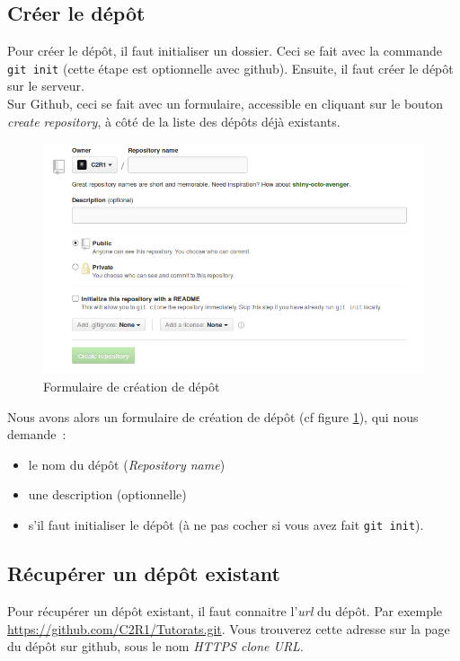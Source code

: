 \documentclass[a4paper,10pt]{report}
\begin{document}
    \subsection{Cr\'eer le d\'ep\^ot}
Pour cr\'eer le d\'ep\^ot, il faut initialiser un dossier. Ceci se fait avec la commande \verb|git init| (cette \'etape est optionnelle avec github). Ensuite, il faut cr\'eer le d\'ep\^ot sur le serveur.\\
Sur Github, ceci se fait avec un formulaire, accessible en cliquant sur le bouton \emph{create repository}, \`a c\^ot\'e de la liste des d\'ep\^ots d\'ej\`a existants.\\
\begin{figure}[h!]
  \begin{center}
    \includegraphics[scale=0.5]{images/createRepoForm}
    \caption{Formulaire de cr\'eation de d\'ep\^ot}
    \label{creationRepo}
  \end{center}
\end{figure}

Nous avons alors un formulaire de cr\'eation de d\'ep\^ot (cf figure \ref{creationRepo}), qui nous demande~:
\begin{itemize}
 \item le nom du d\'ep\^ot (\emph{Repository name})
 \item une description (optionnelle)
 \item s'il faut initialiser le d\'ep\^ot (\`a ne pas cocher si vous avez fait \verb|git init|).
\end{itemize}

    \subsection{R\'ecup\'erer un d\'ep\^ot existant}
Pour r\'ecup\'erer un d\'ep\^ot existant, il faut connaitre l'\emph{url} du d\'ep\^ot. Par exemple \url{https://github.com/C2R1/Tutorats.git}. Vous trouverez cette adresse sur la page du d\'ep\^ot sur github, sous le nom \emph{HTTPS clone URL}.\\
\end{document}
